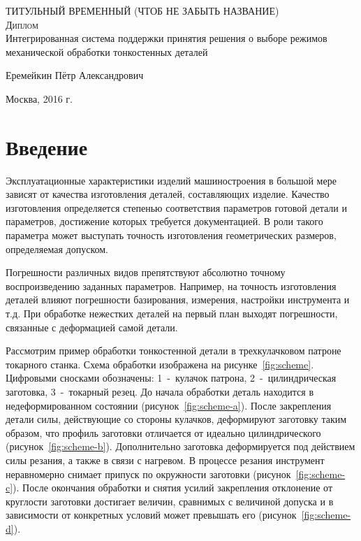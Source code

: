 \documentclass[14pt,oneside,final]{extreport}
\begin{document}
	
	\begin{titlepage}
		\begin{center}			
		
			{\small \textsc{ТИТУЛЬНЫЙ ВРЕМЕННЫЙ (ЧТОБ НЕ ЗАБЫТЬ НАЗВАНИЕ)}\\[5mm]}			
			{\Huge\textsc{Диплом}\\[5mm]}
			{\LARGE Интегрированная система поддержки принятия решения о выборе
				режимов механической обработки тонкостенных деталей}
			\bigskip
			
		\end{center}
		\vfill
		\begin{flushright}
		Еремейкин Пётр Александрович
		\vfill
		\end{flushright}


				
		\begin{center}
			Москва, 2016 г.
		\end{center}
	\end{titlepage}
	
	\renewcommand*\contentsname{\hfill Содержание \hfill}
	\tableofcontents
	
	
	\chapter{Введение}
	Эксплуатационные характеристики изделий машиностроения в большой мере зависят от качества изготовления деталей, составляющих изделие. Качество изготовления определяется степенью соответствия параметров готовой детали и параметров, достижение которых требуется документацией. В роли такого параметра может выступать точность изготовления геометрических размеров, определяемая допуском. 
	
	Погрешности различных видов препятствуют абсолютно точному воспроизведению заданных параметров. Например, на точность изготовления деталей влияют погрешности базирования, измерения, настройки инструмента и т.д. При обработке нежестких деталей на первый план выходят погрешности, связанные с деформацией самой детали.
	
	Рассмотрим пример обработки тонкостенной детали в трехкулачковом патроне токарного станка. Схема обработки изображена на рисунке~\ref{fig:scheme}. Цифровыми сносками обозначены: 1~-~кулачок патрона, 2~-~цилиндрическая заготовка, 3~-~токарный резец. До начала обработки деталь находится в недеформированном состоянии (рисунок~\ref{fig:scheme-a}). После закрепления детали силы, действующие со стороны кулачков, деформируют заготовку таким образом, что профиль заготовки отличается от идеально цилиндрического (рисунок~\ref{fig:scheme-b}). Дополнительно заготовка деформируется под действием силы резания, а также в связи с нагревом. В процессе резания инструмент неравномерно снимает припуск по окружности заготовки (рисунок~\ref{fig:scheme-c}). После окончания обработки и снятия усилий закрепления отклонение от круглости заготовки достигает величин, сравнимых с величиной допуска и в зависимости от конкретных условий может превышать его (рисунок~\ref{fig:scheme-d}).
	
\end{document}
